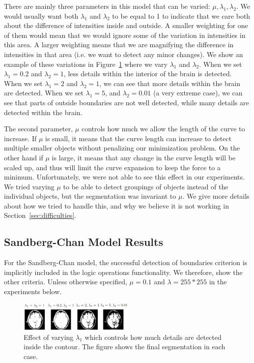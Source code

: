 \documentclass[10pt,twocolumn,letterpaper]{article}
\begin{document}
There are mainly three parameters in this model that can be varied: $\mu, \lambda_{1}, \lambda_{2}$. We would usually want both $\lambda_{1}$ and $\lambda_{2}$
to be equal to 1 to indicate that we care both about the difference of intensities inside and outside. A smaller weighting for one of them would mean that we
would ignore some of the variation in intensities in this area. A larger weighting means that we are magnifying the difference in intensities in that area
(i.e. we want to detect any minor changes). We show an example of these variations in Figure~\ref{fig:cv_eg12} where we vary
$\lambda_1$ and $\lambda_2$. When we set $\lambda_1 = 0.2$ and $\lambda_2 = 1$, less details within the interior of the brain is detected. When
we set $\lambda_1 = 2$ and $\lambda_2 = 1$, we can see that more details within the brain are detected. When we set $\lambda_1 = 5$, and $\lambda_2 = 0.01$ (a
very extreme case), we can see that parts of outside boundaries are not well detected, while many details are detected within the brain.


The second parameter, $\mu$ controls how much we allow the length of the curve to increase. If $\mu$ is small, it means that the curve length can increase to
detect multiple smaller objects without penalizing our minimization problem. On the other hand if $\mu$ is large, it means that any change in the curve length
will be scaled up, and thus will limit the curve expansion to keep the force to a minimum. Unfortunately, we were not able to see this effect in our
experiments. We tried varying $\mu$ to be able to detect groupings of objects instead of the individual objects, but the segmentation was invariant
to $\mu$. We give more details about how we tried to handle this, and why we believe it is not working in Section~\ref{sec:difficulties}.

\subsection{Sandberg-Chan Model Results}

For the Sandberg-Chan model, the successful detection of boundaries criterion is implicitly included in the logic operations functionality. We therefore, show
the other criteria. Unless otherwise specified, $\mu = 0.1$ and $\lambda = 255*255$ in the experiments below.

\begin{figure}[t!]
\centering
\includegraphics[width=0.5\textwidth]{cv_eg12.png}
\caption{Effect of varying $\lambda_1$ which controls how much details are detected inside the contour. The figure shows the final segmentation in each case.}
\label{fig:cv_eg12}
\end{figure}
\end{document}
